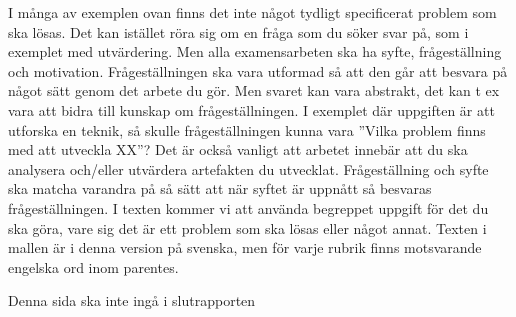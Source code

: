 \documentclass[10pt, titlepage, a4paper, times]{article}
\begin{document}
I m\r{a}nga av exemplen ovan finns det inte n\r{a}got tydligt specificerat problem som ska l\"{o}sas. Det kan ist\"{a}llet r\"{o}ra sig om en fr\r{a}ga som du s\"{o}ker svar p\r{a}, som i exemplet med utv\"{a}rdering. Men alla examensarbeten ska ha syfte, fr\r{a}gest\"{a}llning och motivation. Fr\r{a}gest\"{a}llningen ska vara utformad s\r{a} att den g\r{a}r att besvara p\r{a} n\r{a}got s\"{a}tt genom det arbete du g\"{o}r. Men svaret kan vara abstrakt, det kan t ex vara att bidra till kunskap om fr\r{a}gest\"{a}llningen. I exemplet d\"{a}r uppgiften \"{a}r att utforska en teknik, s\r{a} skulle fr\r{a}gest\"{a}llningen kunna vara ”Vilka problem finns med att utveckla XX”? Det \"{a}r ocks\r{a} vanligt att arbetet inneb\"{a}r att du ska analysera och/eller utv\"{a}rdera artefakten du utvecklat. Fr\r{a}gest\"{a}llning och syfte ska matcha varandra p\r{a} s\r{a} s\"{a}tt att n\"{a}r syftet \"{a}r uppn\r{a}tt s\r{a} besvaras fr\r{a}gest\"{a}llningen.
I texten kommer vi att anv\"{a}nda begreppet uppgift f\"{o}r det du ska g\"{o}ra, vare sig det \"{a}r ett problem som ska l\"{o}sas eller n\r{a}got annat.
Texten i mallen \"{a}r i denna version p\r{a} svenska, men f\"{o}r varje rubrik finns motsvarande engelska ord inom parentes.

Denna sida ska inte ing\r{a} i slutrapporten
\newpage

\end{document}
